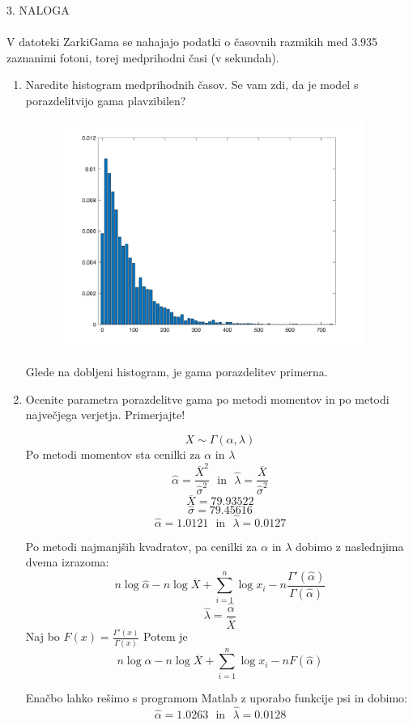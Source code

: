\documentclass[a4paper]{article}
\begin{document}
\large{3. NALOGA} \\ \\
V datoteki ZarkiGama se nahajajo podatki o časovnih razmikih med 3.935 zaznanimi fotoni, torej medprihodni časi (v sekundah).
\begin{enumerate}[label=(\alph*)]
\item Naredite histogram medprihodnih časov. Se vam zdi, da je model s porazdelitvijo gama plavzibilen?
\begin{figure}[h!]
\centering
\includegraphics[width=10cm]{histogram3.png}
\label{Histogram medprehodnih časov}
\end{figure}

Glede na dobljeni histogram, je gama porazdelitev primerna.

\item Ocenite parametra porazdelitve gama po metodi momentov in po metodi največjega verjetja. Primerjajte!

$$X  \sim \Gamma(\alpha, \lambda)$$
Po metodi momentov sta cenilki za $\alpha$ in $\lambda$
$$\hat{\alpha} = \frac{\overline{X}^2}{\hat{\sigma}^2} \ \ \ \text{in} \ \ \ \hat{\lambda} = \frac{\overline{X}}{\hat{\sigma}^2} $$
$$\overline{X} = 79.93522$$
$$\hat{\sigma} = 79.45616$$
$$\hat{\alpha} = 1.0121 \ \ \  \text{in} \ \ \ \hat{\lambda} =  0.0127 $$

Po metodi najmanjših kvadratov, pa cenilki za $\alpha$ in $\lambda$ dobimo z naslednjima dvema izrazoma:
$$n\log{\hat{\alpha}} - n\log{\overline{X}} + \sum_{i=1}^{n} \log{x_i} - n\frac{\Gamma'(\hat{\alpha})}{\Gamma(\hat{\alpha})}$$
$$\hat{\lambda} = \frac{\hat{\alpha}}{\overline{X}}$$
Naj bo $F(x) = \frac{\Gamma'(x)}{\Gamma(x)}$
Potem je 
$$n\log{\hat{\alpha}} - n\log{\overline{X}} + \sum_{i=1}^{n} \log{x_i} - nF(\hat{\alpha})$$

Enačbo lahko rešimo s programom Matlab z uporabo funkcije psi in dobimo:
$$\hat{\alpha} = 1.0263 \ \ \ \text{in} \ \ \ \hat{\lambda} = 0.0128$$


\end{enumerate}
\end{document}
